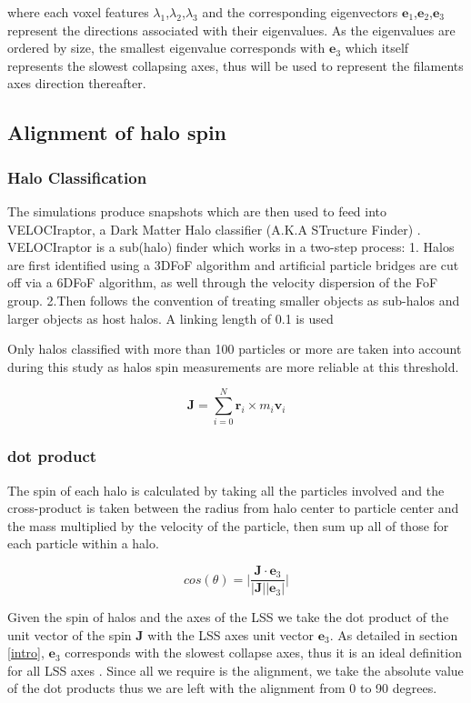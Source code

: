 \documentclass[a4paper,fleqn,usenatbib]{mnras}
\begin{document}
where each voxel features $\lambda_{1}$,$\lambda_{2}$,$\lambda_{3}$ and the corresponding eigenvectors $\textbf{e}_{1}$,$\textbf{e}_{2}$,$\textbf{e}_{3}$ represent the directions associated with their eigenvalues. As the eigenvalues are ordered by size, the smallest eigenvalue corresponds with $\textbf{e}_{3}$  which itself represents the slowest collapsing axes, thus will be used to represent the filaments axes direction thereafter.

\subsection{Alignment of halo spin}\label{alignment}

\subsubsection{Halo Classification}
The simulations produce snapshots which are then used to feed into VELOCIraptor, a Dark Matter Halo classifier (A.K.A STructure Finder) \citep{Elahi_11}. VELOCIraptor is a sub(halo) finder which works in a two-step process:
1. Halos are first identified using a  3DFoF algorithm and artificial  particle bridges are cut off via a 6DFoF algorithm, as well through the velocity dispersion of the FoF group.
2.Then follows the convention of treating smaller objects as sub-halos and larger objects as host halos. 
A linking length of 0.1 is used

Only halos classified with more than 100 particles or more are taken into account during this study as halos spin measurements are more reliable at this threshold. 
\begin{ceqn}
\begin{equation}
\textbf{J}=\sum_{i=0}^{N}\textbf{r}_i\times m_i\textbf{v}_i \label{AM}
\end{equation}
\end{ceqn}

\subsubsection{dot product}

The spin of each halo is calculated by taking all the particles involved and the cross-product is taken between the radius from halo center to particle center and the mass multiplied by the velocity of the particle, then sum up all of those for each particle within a halo.
\begin{ceqn}
\begin{equation}
cos(\theta)=\bigg|\frac{\textbf{J}\cdot \textbf{e}_{3}}{|\textbf{J}| |\textbf{e}_{3}|}\bigg|\label{dotprod}
\end{equation}
\end{ceqn}
Given the spin of halos and the axes of the LSS we take the dot product of the unit vector of the spin \textbf{J} with the LSS axes unit vector $\textbf{e}_{3}$. As detailed in section \ref{intro}, $\textbf{e}_{3}$ corresponds with the slowest collapse axes, thus it is an ideal definition for all LSS axes \citep{Kang_15,Libeskind_14}.
Since all we require is the alignment, we take the absolute value of the dot products thus we are left with the alignment from 0 to 90 degrees. 
\end{document}
